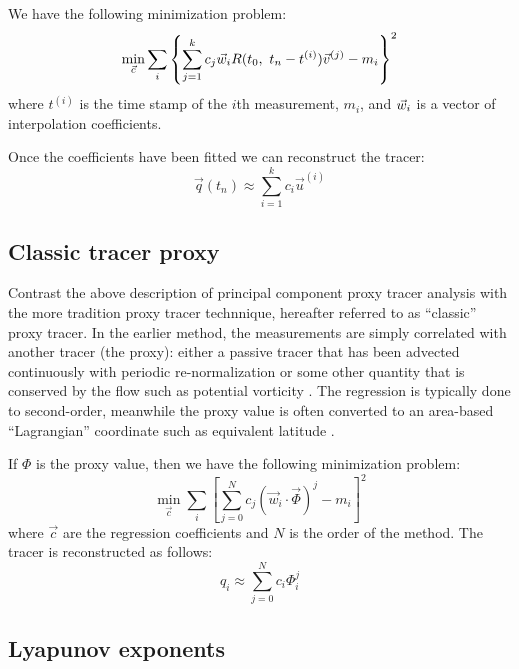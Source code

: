 \documentclass{article}
\begin{document}
We have the following minimization problem:
\begin{equation}
	\min_{\vec c} \sum_i \left \lbrace \sum_{j=1}^k c_j \vec w_i R(t_0, ~ t_n-t^{(i)}) \vec v^{(j)} - m_i \right \rbrace^2
\end{equation}
where $t^{(i)}$ is the time stamp of the $i$th measurement, $m_i$, 
and $\vec w_i$ is a vector of interpolation coefficients.

Once the coefficients have been fitted we can reconstruct the tracer:
\begin{equation}
	\vec q(t_n) \approx \sum_{i=1}^k c_i \vec u^{(i)}
\end{equation}

\subsection{Classic tracer proxy}

\label{classic}

Contrast the above description of principal component proxy tracer
analysis with the more tradition proxy tracer technnique, hereafter
referred to as ``classic'' proxy tracer.
In the earlier method, the measurements are simply correlated with another
tracer (the proxy): either a passive tracer that has been advected
continuously with periodic re-normalization \citep{Allen_Nakamura2003} 
or some other quantity that is conserved by the flow 
such as potential vorticity \citep{Randall_etal2002,Hoskins_etal1985}.
The regression is typically done to second-order, meanwhile the proxy value
is often converted to an area-based ``Lagrangian'' coordinate such as
equivalent latitude \citep{Butchart_Remsberg1986}.

If $\Phi$ is the proxy value, then we have the following minimization
problem:
\begin{equation}
	\min_{\vec c} \sum_i \left [ \sum_{j=0}^N c_j (\vec w_i \cdot \vec \Phi)^j - m_i \right ]^2
\end{equation}
where $\vec c$ are the regression coefficients and $N$ is the order of the
method. The tracer is reconstructed as follows:
\begin{equation}
	q_i \approx \sum_{j=0}^N c_i \Phi_i^j
\end{equation}

\subsection{Lyapunov exponents}
\end{document}
